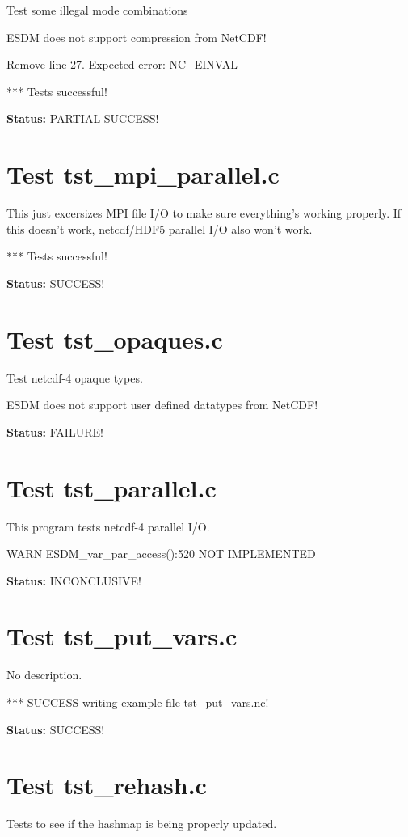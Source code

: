 Test some illegal mode combinations

ESDM does not support compression from NetCDF!

Remove line 27. Expected error: NC\_EINVAL

*** Tests successful!

{\bf \large Status: } PARTIAL SUCCESS!

\section{Test tst\_mpi\_parallel.c}

This just excersizes MPI file I/O to make sure everything's working properly. If this doesn't work, netcdf/HDF5 parallel I/O also won't work.

*** Tests successful!

{\bf \large Status: } SUCCESS!

\section{Test tst\_opaques.c}

Test netcdf-4 opaque types.

ESDM does not support user defined datatypes from NetCDF!

{\bf \large Status: } FAILURE!

\section{Test tst\_parallel.c}

This program tests netcdf-4 parallel I/O.

WARN ESDM\_var\_par\_access():520 NOT IMPLEMENTED

{\bf \large Status: } INCONCLUSIVE!

\section{Test tst\_put\_vars.c}

No description.

*** SUCCESS writing example file tst\_put\_vars.nc!

{\bf \large Status: } SUCCESS!

\section{Test tst\_rehash.c}

Tests to see if the hashmap is being properly updated.

